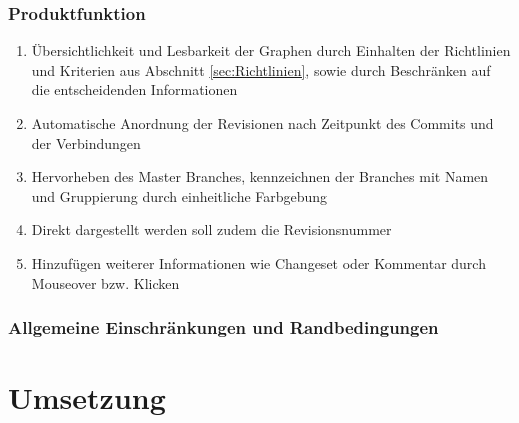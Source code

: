 \documentclass[color]{tudbook}
\begin{document}
\subsection{Produktfunktion}
\begin{enumerate}
\item Übersichtlichkeit und Lesbarkeit der Graphen durch Einhalten der Richtlinien und Kriterien aus Abschnitt \ref{sec:Richtlinien}, sowie durch Beschränken auf die entscheidenden Informationen
\item Automatische Anordnung der Revisionen nach Zeitpunkt des Commits und der Verbindungen
\item Hervorheben des Master Branches, kennzeichnen der Branches mit Namen und Gruppierung durch einheitliche Farbgebung
\item Direkt dargestellt werden soll zudem die Revisionsnummer
\item Hinzufügen weiterer Informationen wie Changeset oder Kommentar durch Mouseover bzw. Klicken
\end{enumerate}

\subsection{Allgemeine Einschränkungen und Randbedingungen}



\chapter{Umsetzung}



\end{document}
